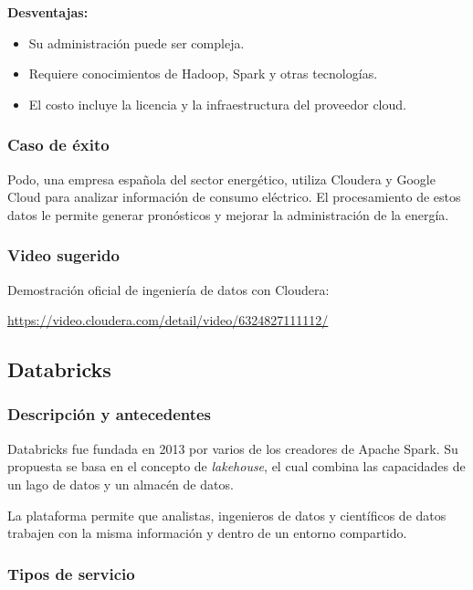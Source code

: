 \textbf{Desventajas:}

\begin{itemize}
    \item Su administración puede ser compleja.
    \item Requiere conocimientos de Hadoop, Spark y otras tecnologías.
    \item El costo incluye la licencia y la infraestructura del proveedor cloud.
\end{itemize}

\subsubsection*{Caso de éxito}

Podo, una empresa española del sector energético, utiliza Cloudera y Google
Cloud para analizar información de consumo eléctrico. El procesamiento de
estos datos le permite generar pronósticos y mejorar la administración de la
energía.

\subsubsection*{Video sugerido}

Demostración oficial de ingeniería de datos con Cloudera:

\url{https://video.cloudera.com/detail/video/6324827111112/}


\subsection{Databricks}

\subsubsection*{Descripción y antecedentes}

Databricks fue fundada en 2013 por varios de los creadores de Apache Spark.
Su propuesta se basa en el concepto de \textit{lakehouse}, el cual combina las
capacidades de un lago de datos y un almacén de datos.

La plataforma permite que analistas, ingenieros de datos y científicos de
datos trabajen con la misma información y dentro de un entorno compartido.

\subsubsection*{Tipos de servicio}

